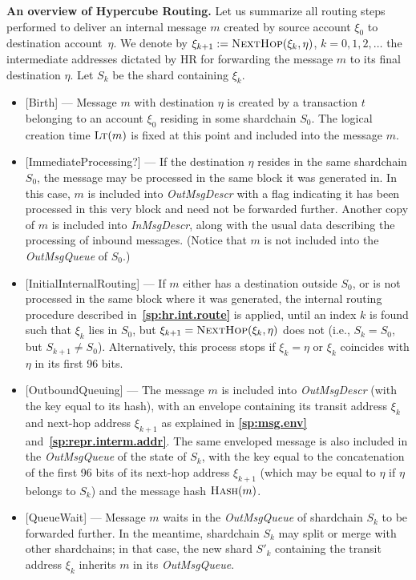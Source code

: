 \documentclass[12pt,oneside]{article}
\def\makepoint#1{\medbreak\noindent{\bf #1.\ }}
\def\nxsubpoint{\refstepcounter{subsubsection}%
  \smallbreak\makepoint{\thesubsubsection}}
\def\refpoint#1{{\rm\textbf{\ref{#1}}}}
\let\ptref=\refpoint
\def\emb#1{\textbf{#1.}}
\def\opsc#1{\operatorname{\textsc{#1}}}
\def\Hash{\opsc{Hash}}
\def\LT{\opsc{Lt}}
\def\NextHop{\opsc{NextHop}}
\begin{document}
\nxsubpoint\label{sp:hr.overview}\emb{An overview of Hypercube Routing}
Let us summarize all routing steps performed to deliver an internal message $m$ created by source account $\xi_0$ to destination account~$\eta$. We denote by $\xi_{k+1}:=\NextHop(\xi_k,\eta)$, $k=0,1,2,\ldots$ the intermediate addresses dictated by HR for forwarding the message $m$ to its final destination $\eta$. Let $S_k$ be the shard containing $\xi_k$.
\begin{itemize}
\item{[Birth]} --- Message $m$ with destination $\eta$ is created by a transaction $t$ belonging to an account $\xi_0$ residing in some shardchain $S_0$. The logical creation time $\LT(m)$ is fixed at this point and included into the message $m$.
\item{[ImmediateProcessing?]} --- If the destination $\eta$ resides in the same shardchain $S_0$, the message may be processed in the same block it was generated in. In this case, $m$ is included into {\em OutMsgDescr\/} with a flag indicating it has been processed in this very block and need not be forwarded further. Another copy of $m$ is included into {\em InMsgDescr}, along with the usual data describing the processing of inbound messages. (Notice that $m$ is not included into the {\em OutMsgQueue\/} of $S_0$.)
\item{[InitialInternalRouting]} --- If $m$ either has a destination outside $S_0$, or is not processed in the same block where it was generated, the internal routing procedure described in~\ptref{sp:hr.int.route} is applied, until an index $k$ is found such that $\xi_k$ lies in $S_0$, but $\xi_{k+1}=\NextHop(\xi_k,\eta)$ does not (i.e., $S_k=S_0$, but $S_{k+1}\neq S_0$). Alternatively, this process stops if $\xi_k=\eta$ or $\xi_k$ coincides with $\eta$ in its first 96 bits.
\item{[OutboundQueuing]} --- The message $m$ is included into {\em OutMsgDescr\/} (with the key equal to its hash), with an envelope containing its transit address $\xi_k$ and next-hop address $\xi_{k+1}$ as explained in \ptref{sp:msg.env} and~\ptref{sp:repr.interm.addr}. The same enveloped message is also included in the {\em OutMsgQueue\/} of the state of $S_k$, with the key equal to the concatenation of the first 96 bits of its next-hop address $\xi_{k+1}$ (which may be equal to $\eta$ if $\eta$ belongs to $S_k$) and the message hash $\Hash(m)$.
\item{[QueueWait]} --- Message $m$ waits in the {\em OutMsgQueue\/} of shardchain $S_k$ to be forwarded further. In the meantime, shardchain $S_k$ may split or merge with other shardchains; in that case, the new shard $S'_k$ containing the transit address $\xi_k$ inherits $m$ in its {\em OutMsgQueue}.

\end{itemize}
\end{document}
